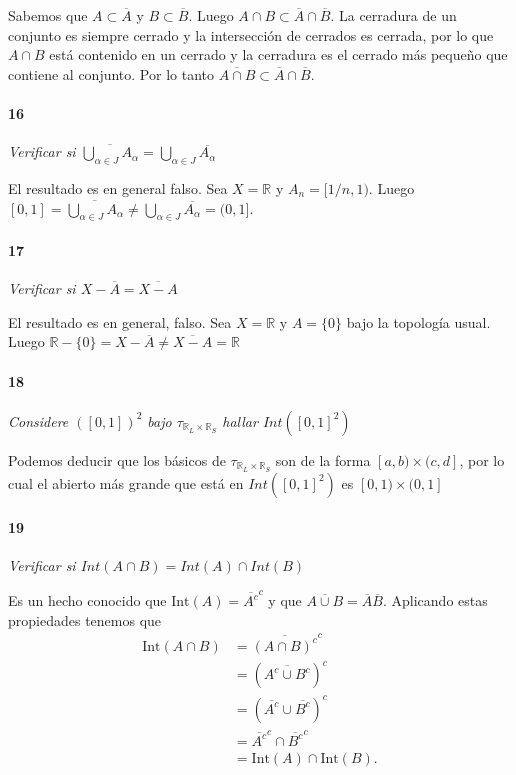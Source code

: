\documentclass[12pt]{article}
\begin{document}
Sabemos que $A \subset \overline{A}$ y $B \subset \overline{B}$. Luego $A \cap B \subset \overline{A} \cap \overline{B}$. La cerradura de un conjunto es siempre
cerrado y la intersección de cerrados es cerrada, por lo que $A \cap B$ está contenido en un cerrado y la cerradura es el cerrado más pequeño que contiene al conjunto. Por lo tanto
$\overline{A \cap B} \subset \overline{A} \cap \overline{B}$.

\paragraph{16}
\textit{Verificar si $\overline{\bigcup\limits_{\alpha\in J}A_{\alpha}}=\bigcup\limits_{\alpha\in J}\overline{A_{\alpha}}$}

El resultado es en general falso. Sea $X=\mathbb{R}$ y $A_n=[1/n,1)$.
Luego $[0,1]=\overline{\bigcup\limits_{\alpha\in J}A_{\alpha}} \neq \bigcup\limits_{\alpha\in J}\overline{A_{\alpha}} =(0,1]$.
\paragraph{17}
\textit{Verificar si $X-\overline{A}=\overline{X-A}$}

El resultado es en general, falso. Sea $X=\mathbb{R}$ y $A=\{0\}$ bajo la topología usual.
 Luego $\mathbb{R}-\{0\} = X-\overline{A}\neq \overline{X-A} = \mathbb{R}$

\paragraph{18}
\textit{Considere $([0,1])^2$ bajo $\tau_{\mathbb{R}_L\times\mathbb{R}_S}$ hallar $Int([0,1]^2)$}

Podemos deducir que los b\'asicos de $\tau_{\mathbb{R}_L\times\mathbb{R}_S}$
son de la forma $[a, b) \times (c, d]$, por lo cual el abierto m\'as
grande que est\'a en $Int([0,1]^2)$ es $[0, 1) \times (0, 1]$

\paragraph{19}
\textit{Verificar si $Int(A\cap B)=Int(A)\cap Int(B)$}

Es un hecho conocido que $\text{Int}(A)=\overline{A^c}^c$ y que $\overline{A \cup B}=\overline{A} \overline{B}$. Aplicando estas propiedades tenemos que 
\begin{align*}
    \text{Int}(A \cap B) &=\overline{(A \cap B)^c}^c \\
                         &=(\overline{A^c \cup B^c})^c \\
                         &=(\overline{A^c} \cup \overline{B^c})^c \\
                         &=\overline{A^c}^c \cap \overline{B^c}^c \\
                         &=\text{Int}(A) \cap \text{Int}(B).
\end{align*}
\end{document}
